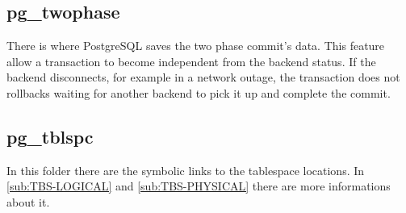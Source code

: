 \subsection{pg\_twophase}
There is where PostgreSQL saves the two phase commit's data. This feature allow a transaction to
become independent from the backend status. If the backend disconnects, for example in a network
outage, the transaction does not rollbacks waiting for another backend to pick it up and complete
the commit. 

\subsection{pg\_tblspc}
\label{sub:TABLESPACE}
In this folder there are the symbolic links to the tablespace locations.
In \ref{sub:TBS-LOGICAL} and \ref{sub:TBS-PHYSICAL} there are more informations about it. 



